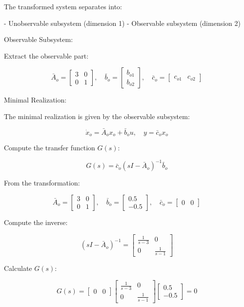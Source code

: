 \documentclass[12pt]{article}
\begin{document}
The transformed system separates into:

- Unobservable subsystem (dimension 1)
- Observable subsystem (dimension 2)

Observable Subsystem:

Extract the observable part:

\[
\bar{A}_{o} = \begin{bmatrix}
3 & 0 \\
0 & 1
\end{bmatrix}, \quad
\bar{b}_{o} = \begin{bmatrix}
b_{o1} \\ b_{o2}
\end{bmatrix}, \quad
\bar{c}_{o} = \begin{bmatrix}
c_{o1} & c_{o2}
\end{bmatrix}
\]

Minimal Realization:

The minimal realization is given by the observable subsystem:

\[
\dot{x}_{o} = \bar{A}_{o} x_{o} + \bar{b}_{o} u, \quad y = \bar{c}_{o} x_{o}
\]

Compute the transfer function \( G(s) \):

\[
G(s) = \bar{c}_{o}(sI - \bar{A}_{o})^{-1}\bar{b}_{o}
\]

From the transformation:

\[
\bar{A}_{o} = \begin{bmatrix}
3 & 0 \\
0 & 1
\end{bmatrix}, \quad
\bar{b}_{o} = \begin{bmatrix}
0.5 \\
-0.5
\end{bmatrix}, \quad
\bar{c}_{o} = \begin{bmatrix}
0 & 0
\end{bmatrix}
\]

Compute the inverse:

\[
(sI - \bar{A}_{o})^{-1} = \begin{bmatrix}
\frac{1}{s - 3} & 0 \\
0 & \frac{1}{s - 1}
\end{bmatrix}
\]

Calculate \( G(s) \):

\[
G(s) = \begin{bmatrix}
0 & 0
\end{bmatrix}
\begin{bmatrix}
\frac{1}{s - 3} & 0 \\
0 & \frac{1}{s - 1}
\end{bmatrix}
\begin{bmatrix}
0.5 \\
-0.5
\end{bmatrix}
= 0
\]
\end{document}
